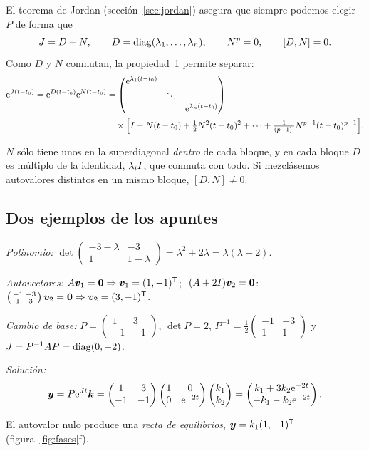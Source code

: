 \documentclass[11pt,twoside]{article}
\newcommand\vy{\bm{y}}
\newcommand\vv{\bm{v}}
\newcommand\vk{\bm{k}}
\newcommand\mat[1]{\begin{pmatrix}#1\end{pmatrix}}
\newcommand\smat[1]{\left(\begin{smallmatrix}#1\end{smallmatrix}\right)}
\begin{document}
El teorema de Jordan (sección~\ref{sec:jordan}) asegura que siempre podemos elegir $P$ de forma que
\begin{equation}\label{eq:DN}
J=D+N,\qquad D=\operatorname{diag}(\lambda_1,\dots,\lambda_n),\qquad N^p=0,\qquad [D,N]=0 .
\end{equation}
Como $D$ y $N$ conmutan, la propiedad~1 permite separar:
\begin{equation}\label{eq:eJt}
\begin{aligned}
\e^{J(t-t_0)}=\e^{D(t-t_0)}\e^{N(t-t_0)}
&=\mat{\e^{\lambda_1(t-t_0)}&&\\&\ddots&\\&&\e^{\lambda_n(t-t_0)}}\\
&\quad\times\Big[\Id+N(t-t_0)+\tfrac12N^2(t-t_0)^2+\dots+\tfrac{1}{(p-1)!}N^{p-1}(t-t_0)^{p-1}\Big].
\end{aligned}
\end{equation}

\begin{observacion}
$N$ sólo tiene unos en la superdiagonal \emph{dentro} de cada bloque, y en cada bloque $D$ es múltiplo de la
identidad, $\lambda_iI$, que conmuta con todo. Si mezclásemos autovalores distintos en un mismo bloque, $[D,N]\neq0$.
\end{observacion}

\subsection{Dos ejemplos de los apuntes}

\begin{ejemplo}[raíces simples, $A=\smat{-3&-3\\1&1}$]\label{ej:3-1}
\begin{pasos}
\item \emph{Polinomio:} $\det\smat{-3-\lambda&-3\\1&1-\lambda}=\lambda^2+2\lambda=\lambda(\lambda+2)$.
\item \emph{Autovectores:} $A\vv_1=\bm0\Rightarrow\vv_1=(1,-1)\T$; $\ (A+2\Id)\vv_2=\bm0$:
$\smat{-1&-3\\1&3}\vv_2=\bm0\Rightarrow\vv_2=(3,-1)\T$.
\item \emph{Cambio de base:} $P=\smat{1&3\\-1&-1}$, $\det P=2$, $P^{-1}=\frac12\smat{-1&-3\\1&1}$ y
$J=P^{-1}AP=\operatorname{diag}(0,-2)$.
\item \emph{Solución:}
\begin{equation*}
\vy=P\e^{Jt}\vk=\mat{1&3\\-1&-1}\mat{1&0\\0&\e^{-2t}}\mat{k_1\\k_2}=\mat{k_1+3k_2\e^{-2t}\\-k_1-k_2\e^{-2t}}.
\end{equation*}
\end{pasos}
El autovalor nulo produce una \emph{recta de equilibrios}, $\vy=k_1(1,-1)\T$ (figura~\ref{fig:fases}f).
\end{ejemplo}
\end{document}
